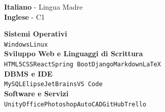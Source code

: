 \documentclass[9pt]{developercv} %
\begin{document}
\begin{minipage}[t]{0.34\textwidth} %
	\vspace{-\baselineskip} %

	
	\textbf{Italiano} - Lingua Madre\\
	\textbf{Inglese} - C1
\end{minipage}
\hfill %
\begin{minipage}[t]{0.65\textwidth} %
	\vspace{-\baselineskip} %
	
	
	\textbf{Sistemi Operativi} \\
	\texttt{Windows}\slashsep\texttt{Linux}\\
	\textbf{Sviluppo Web e Linguaggi di Scrittura}\\
	\texttt{HTML5}\slashsep\texttt{CSS}\slashsep\texttt{React}\slashsep\texttt{Spring Boot}\slashsep\texttt{Django}\slashsep\texttt{Markdown}\slashsep\texttt{LaTeX}\\
	\textbf{DBMS e IDE}\\
	\texttt{MySQL}\slashsep\texttt{Elipse}\slashsep\texttt{JetBrains}\slashsep\texttt{VS Code}\\
	\textbf{Software e Servizi}\\
	\texttt{Unity}\slashsep\texttt{Office}\slashsep\texttt{Photoshop}\slashsep\texttt{AutoCAD}\slashsep\texttt{GitHub}\slashsep\texttt{Trello}
\end{minipage}


%
%	
%	
%	
%	
%	
\end{document}
